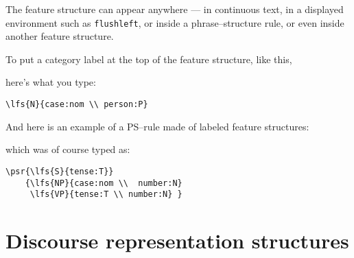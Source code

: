 \documentclass{article}
\begin{document}
The feature structure can appear anywhere --- in continuous text, in a
displayed environment such as {\tt flushleft}, or inside a
phrase--structure rule, or even inside another feature structure.

To put a category label at the top of the feature structure, like this,
\begin{flushleft}
\end{flushleft}
here's what you type:
\begin{verbatim}
\lfs{N}{case:nom \\ person:P}
\end{verbatim}
And here is an example of a PS--rule made of labeled feature structures:
\begin{flushleft}
    {
      }
\end{flushleft}
which was of course typed as:
\begin{verbatim}
\psr{\lfs{S}{tense:T}}
    {\lfs{NP}{case:nom \\  number:N}
     \lfs{VP}{tense:T \\ number:N} }
\end{verbatim}


\section{Discourse representation structures}
\end{document}
